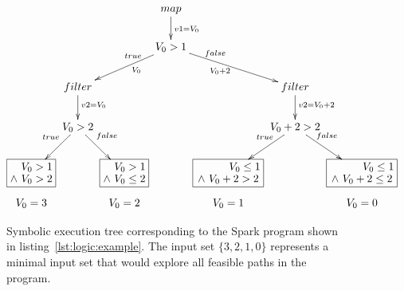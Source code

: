 \begin{figure}[t]
	\[\xymatrix@C=0.3em @R=0.8em{ 
		& & & \ar[dd]^<(0.4){v1 = V_{0}} map & & & & \\
		& & & & & & & \\
		& & & \ar@{}[lldd]_<(0.2){true} \ar@{}[lldd]^>(0.5){V_{0}} \ar[lldd] V_{0} > 1 \ar[rrdd] \ar@{}[rrdd]_>(0.5){V_{0} + 2} \ar@{}[rrdd]^<(0.2){false} & & & & \\
		& & & & & & & \\
		& \ar[dd]^<(0.3){v2 = V_{0}} filter & & & & \ar[dd]^<(0.3){v2 = V_{0} + 2} filter & \\
		& & & & & & & \\
		& \ar@{}[ldd]_<(0.2){true} \ar[ldd] V_{0} > 2 \ar[rdd] \ar@{}[rdd]^<(0.2){false} & & & & \ar@{}[ldd]_<(0.2){true} \ar[ldd] V_{0} + 2 > 2 \ar[rdd] \ar@{}[rdd]^<(0.2){false} & \\
		& & & & & & & \\
		*+[F] \txt{$~~~V_{0} > 1$ 
			\\ $\land ~V_{0} > 2$} & & 
		*+[F] \txt{$~~~V_{0} > 1$ 
			\\ $\land ~V_{0} \leq 2$} & &
		*+[F] \txt{$~~~~~~~~~V_{0} \leq 1$ 
			\\ $\land ~V_{0} + 2 > 2$} & &
		*+[F] \txt{$~~~~~~~~~V_{0} \leq 1$ 
			\\ $\land ~V_{0} + 2 \leq 2$} \\
		V_{0} = 3 & & V_{0} = 2 & & V_{0} = 1 & & V_{0} = 0 & 
	} \]
	\caption[Symbolic Execution Tree of a Trivial Spark Program]{Symbolic execution tree corresponding to the Spark program shown in listing~\ref{lst:logic:example}. The input set $\{3,2,1,0\}$ represents a minimal input set that would explore all feasible paths in the program.}
	\label{fig:logic:symbolic-spark-example}
\end{figure}
